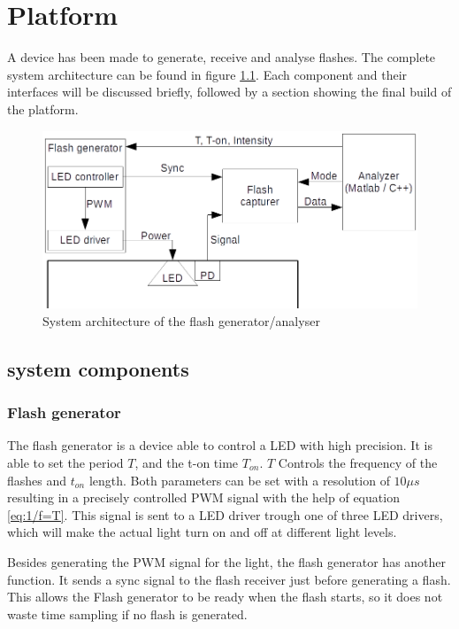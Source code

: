 \chapter{Platform}
\label{chp:Platform}
A device has been made to generate, receive and analyse flashes. The complete system architecture can be found in figure \ref{fig:systemOveriew}. Each component and their interfaces will be discussed briefly, followed by a section showing the final build of the platform.

\begin{figure}[h]
	\includegraphics[width=\textwidth]{pics/systemOverview.png}
	\caption{System architecture of the flash generator/analyser}
	\label{fig:systemOveriew}
\end{figure}

\section{system components}

\subsection{Flash generator}
The flash generator is a device able to control a LED with high precision. It is able to set the period $T$, and the t-on time $T_{on}$. $T$ Controls the frequency of the flashes and $t_{on}$ length. Both parameters can be set with a resolution of $10\mu s$ resulting in a precisely controlled PWM signal with the help of equation \ref{eq:1/f=T}. This signal is sent to a LED driver trough one of three LED drivers, which will make the actual light turn on and off at different light levels.

Besides generating the PWM signal for the light, the flash generator has another function. It sends a sync signal to the flash receiver just before generating a flash. This allows the Flash generator to be ready when the flash starts, so it does not waste time sampling if no flash is generated.

